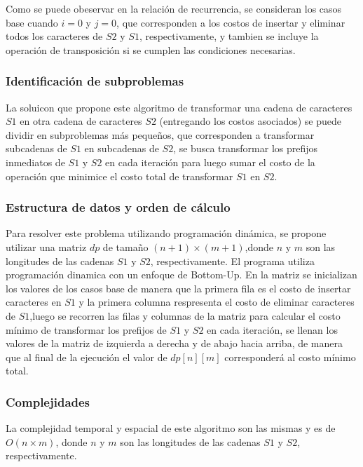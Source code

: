 Como se puede obeservar en la relación de recurrencia, se consideran los casos base cuando $i = 0$ y $j = 0$,
que corresponden a los costos de insertar y eliminar todos los caracteres de $S2$ y $S1$, respectivamente, y tambien
se incluye la operación de transposición si se cumplen las condiciones necesarias.

\subsubsection{Identificación de subproblemas}

La soluicon que propone este algoritmo de transformar una cadena de caracteres $S1$ en otra cadena de caracteres $S2$ 
(entregando los costos asociados) se puede dividir en subproblemas más pequeños, que corresponden a transformar
subcadenas de $S1$ en subcadenas de $S2$, se busca transformar los prefijos inmediatos de $S1$ y $S2$ en cada iteración
para luego sumar el costo de la operación que minimice el costo total de transformar $S1$ en $S2$.

\subsubsection{Estructura de datos y orden de cálculo}

Para resolver este problema utilizando programación dinámica, se propone utilizar una matriz $dp$ de tamaño $(n+1) 
\times (m+1)$,donde $n$ y $m$ son las longitudes de las cadenas $S1$ y $S2$, respectivamente. El programa utiliza
programación dinamica con un enfoque de Bottom-Up. En la matriz se inicializan los valores de los casos base de
manera que la primera fila es el costo de insertar caracteres en $S1$ y la primera columna respresenta el costo de
eliminar caracteres de $S1$,luego se recorren las filas y columnas de la matriz para calcular el costo mínimo 
de transformar los prefijos de $S1$ y $S2$ en cada iteración, se llenan los valores de la matriz de izquierda a derecha
y de abajo hacia arriba, de manera que al final de la ejecución el valor de $dp[n][m]$ corresponderá al costo mínimo total.

\subsubsection{Complejidades}

La complejidad temporal y espacial de este algoritmo son las mismas y es de $O(n \times m)$, donde $n$ y $m$ son 
las longitudes de las cadenas $S1$ y $S2$, respectivamente.

